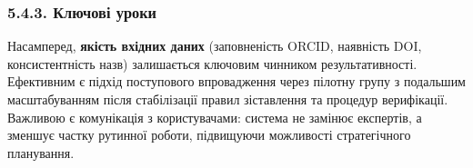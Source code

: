\subsubsection*{5.4.3. Ключові уроки}

Насамперед, \textbf{якість вхідних даних} (заповненість ORCID, наявність DOI, консистентність назв) залишається ключовим чинником результативності. Ефективним є підхід поступового впровадження через пілотну групу з подальшим масштабуванням після стабілізації правил зіставлення та процедур верифікації. Важливою є комунікація з користувачами: система не замінює експертів, а зменшує частку рутинної роботи, підвищуючи можливості стратегічного планування.
